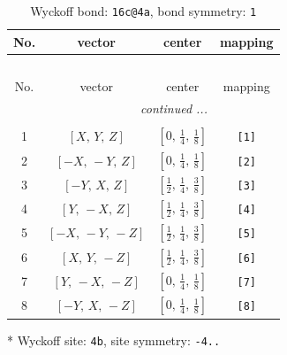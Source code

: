 \documentclass[fleqn,8pt]{jsarticle}
\begin{document}
\renewcommand{\arraystretch}{1.2}
\begin{longtable}{cccc}
\caption{Wyckoff bond: {\tt 16c@4a}, bond symmetry: {\tt 1}}
 \\
 \hline \hline
No. & vector & center & mapping \\ \hline \endfirsthead

\multicolumn{3}{l}{\tablename\ \thetable{}} \\
 \hline \hline
No. & vector & center & mapping \\ \hline \endhead

 \hline \hline
\multicolumn{3}{r}{\footnotesize\it continued ...} \\ \endfoot

 \hline \hline
\multicolumn{3}{r}{} \\ \endlastfoot

1 & $\left[ X,\, Y,\, Z \right]$ & $\left[ 0,\, \frac{1}{4},\, \frac{1}{8} \right]$ & {\tt [1]} \\ \hline
2 & $\left[ - X,\, - Y,\, Z \right]$ & $\left[ 0,\, \frac{1}{4},\, \frac{1}{8} \right]$ & {\tt [2]} \\ \hline
3 & $\left[ - Y,\, X,\, Z \right]$ & $\left[ \frac{1}{2},\, \frac{1}{4},\, \frac{3}{8} \right]$ & {\tt [3]} \\ \hline
4 & $\left[ Y,\, - X,\, Z \right]$ & $\left[ \frac{1}{2},\, \frac{1}{4},\, \frac{3}{8} \right]$ & {\tt [4]} \\ \hline
5 & $\left[ - X,\, - Y,\, - Z \right]$ & $\left[ \frac{1}{2},\, \frac{1}{4},\, \frac{3}{8} \right]$ & {\tt [5]} \\ \hline
6 & $\left[ X,\, Y,\, - Z \right]$ & $\left[ \frac{1}{2},\, \frac{1}{4},\, \frac{3}{8} \right]$ & {\tt [6]} \\ \hline
7 & $\left[ Y,\, - X,\, - Z \right]$ & $\left[ 0,\, \frac{1}{4},\, \frac{1}{8} \right]$ & {\tt [7]} \\ \hline
8 & $\left[ - Y,\, X,\, - Z \right]$ & $\left[ 0,\, \frac{1}{4},\, \frac{1}{8} \right]$ & {\tt [8]} \\
\end{longtable}
* Wyckoff site: {\tt 4b}, site symmetry: {\tt -4..}
\renewcommand{\arraystretch}{1.2}
\end{document}
